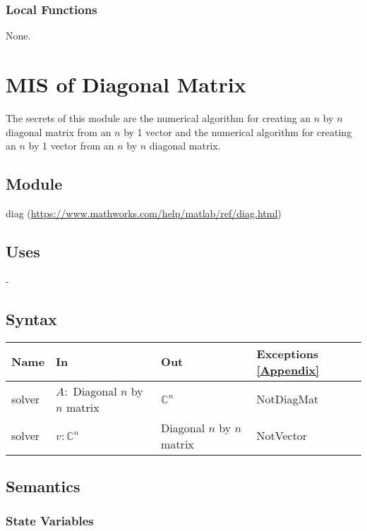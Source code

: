 \documentclass[12pt, titlepage]{article}
\begin{document}
\subsubsection{Local Functions} 

None. 

\newpage

\section{MIS of Diagonal Matrix} \label{MDM}

The secrets of this module are the numerical algorithm for creating an $n$ by 
$n$ diagonal 
matrix from an $n$ by 1 vector and the numerical algorithm for creating an $n$ 
by 1 vector from an $n$ by $n$ diagonal 
matrix. 

\subsection{Module}

diag (\url{https://www.mathworks.com/help/matlab/ref/diag.html})

\subsection{Uses}

-

\subsection{Syntax}

\begin{center}
	\begin{tabular}{p{2cm} p{6cm} p{6cm} p{3cm}}
		\hline
		\textbf{Name} & \textbf{In} & \textbf{Out} & \textbf{Exceptions} 
		\ref{Appendix} \\
		\hline
		solver & $A :$ Diagonal $n$ by $n$ matrix  & $\mathbb{C}^{n}$ & 
		NotDiagMat \\ 
		solver & $v :\mathbb{C}^{n}$  & Diagonal $n$ by $n$ matrix & 
		NotVector \\
		\hline
	\end{tabular}
\end{center}

\subsection{Semantics}

\subsubsection{State Variables}
\end{document}
